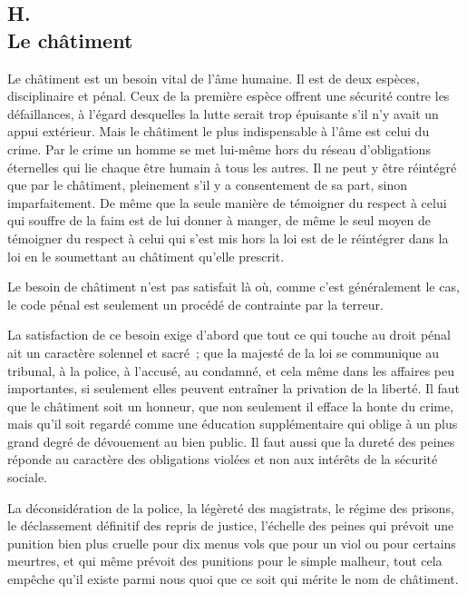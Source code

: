 \documentclass[french,twoside]{book} %
\begin{document}
\subsection[{H. Le châtiment}]{H. \\
Le châtiment}
\noindent \par
Le châtiment est un besoin vital de l'âme humaine. Il est de deux espèces, disciplinaire et pénal. Ceux de la première espèce offrent une sécurité contre les défaillances, à l'égard desquelles la lutte serait trop épuisante s'il n'y avait un appui extérieur. Mais le châtiment le plus indispensable à l'âme est celui du crime. Par le crime un homme se met lui-même hors du réseau d'obligations éternelles qui lie chaque être humain à tous les autres. Il ne peut y être réintégré que par le châtiment, pleinement s'il y a consentement de sa part, sinon imparfaitement. De même que la seule manière de témoigner du respect à celui qui souffre de la faim est de lui donner à manger, de même le seul moyen de témoigner du respect à celui qui s'est mis hors la loi est de le réintégrer dans la loi en le soumettant au châtiment qu'elle prescrit.\par
Le besoin de châtiment n'est pas satisfait là où, comme c'est généralement le cas, le code pénal est seulement un procédé de contrainte par la terreur.\par
La satisfaction de ce besoin exige d'abord que tout ce qui touche au droit pénal ait un caractère solennel et sacré ; que la majesté de la loi se communique au tribunal, à la police, à l'accusé, au condamné, et cela même dans les affaires peu importantes, si seulement elles peuvent entraîner la privation de la liberté. Il faut que le châtiment soit un honneur, que non seulement il efface la honte du crime, mais qu'il soit regardé comme une éducation supplémentaire qui oblige à un plus grand degré de dévouement au bien public. Il faut aussi que la dureté des peines réponde au caractère des obligations violées et non aux intérêts de la sécurité sociale.\par
La déconsidération de la police, la légèreté des magistrats, le régime des prisons, le déclassement définitif des repris de justice, l'échelle des peines qui prévoit une punition bien plus cruelle pour dix menus vols que pour un viol ou pour certains meurtres, et qui même prévoit des punitions pour le simple malheur, tout cela empêche qu'il existe parmi nous quoi que ce soit qui mérite le nom de châtiment.\par
\end{document}
